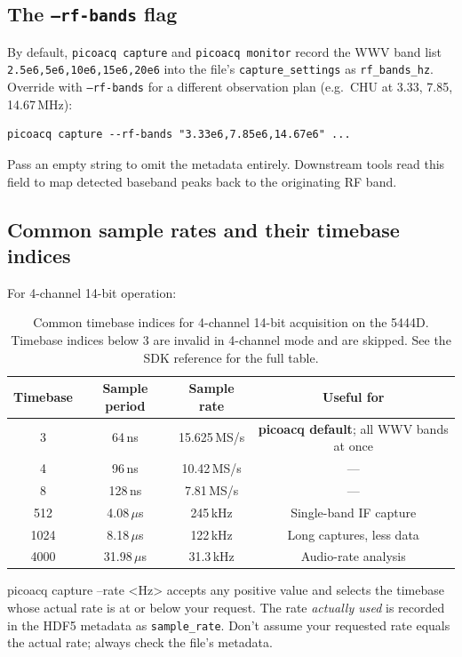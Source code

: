 \documentclass[11pt]{article}
\begin{document}
\subsection{The \texttt{--rf-bands} flag}

By default, \texttt{picoacq capture} and \texttt{picoacq monitor}
record the WWV band list
\texttt{2.5e6,5e6,10e6,15e6,20e6} into the file's
\texttt{capture\_settings} as \texttt{rf\_bands\_hz}.  Override with
\texttt{--rf-bands} for a different observation plan
(e.g.\ CHU at 3.33, 7.85, 14.67\,MHz):

\begin{lstlisting}[style=shell]
picoacq capture --rf-bands "3.33e6,7.85e6,14.67e6" ...
\end{lstlisting}

Pass an empty string to omit the metadata entirely.  Downstream tools
read this field to map detected baseband peaks back to the originating
RF band.

\subsection{Common sample rates and their timebase indices}

For 4-channel 14-bit operation:

\begin{table}[h]
\centering
\begin{tabular}{cccc}
\toprule
\textbf{Timebase} & \textbf{Sample period} & \textbf{Sample rate} & \textbf{Useful for} \\
\midrule
3 & 64\,ns & 15.625\,MS/s & \textbf{picoacq default}; all WWV bands at once \\
4 & 96\,ns & 10.42\,MS/s & --- \\
8 & 128\,ns & 7.81\,MS/s & --- \\
512 & 4.08\,$\mu$s & 245\,kHz & Single-band IF capture \\
1024 & 8.18\,$\mu$s & 122\,kHz & Long captures, less data \\
4000 & 31.98\,$\mu$s & 31.3\,kHz & Audio-rate analysis \\
\bottomrule
\end{tabular}
\caption{Common timebase indices for 4-channel 14-bit
acquisition on the 5444D.  Timebase indices below 3 are invalid
in 4-channel mode and are skipped.  See the SDK reference for the
full table.}
\label{tab:timebase}
\end{table}

\textsf{picoacq capture --rate <Hz>} accepts any positive value and
selects the timebase whose actual rate is at or below your request.
The rate \emph{actually used} is recorded in the HDF5 metadata as
\texttt{sample\_rate}.  Don't assume your requested rate equals the
actual rate; always check the file's metadata.
\end{document}
